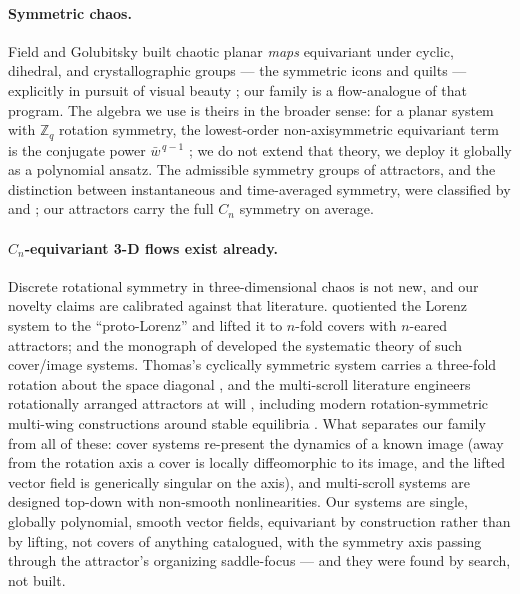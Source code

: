 \documentclass[11pt]{article}
\newcommand{\conj}[1]{\bar{#1}}
\begin{document}
\paragraph{Symmetric chaos.}
Field and Golubitsky built chaotic planar \emph{maps} equivariant under
cyclic, dihedral, and crystallographic groups --- the symmetric icons and
quilts --- explicitly in pursuit of visual beauty
\citep{fieldGolubitsky2009}; our family is a flow-analogue of that program.
The algebra we use is theirs in the broader sense: for a planar system with
$\mathbb{Z}_q$ rotation symmetry, the lowest-order non-axisymmetric
equivariant term is the conjugate power $\conj{w}^{\,q-1}$
\citep{golubitskyStewartSchaeffer1988}; we do not extend that theory, we
deploy it globally as a polynomial ansatz. The admissible symmetry groups
of attractors, and the distinction between instantaneous and time-averaged
symmetry, were classified by \citet{melbourneDellnitzGolubitsky1993} and
\citet{ashwinMelbourne1994}; our attractors carry the full $C_n$ symmetry
on average.

\paragraph{$C_n$-equivariant 3-D flows exist already.}
Discrete rotational symmetry in three-dimensional chaos is not new, and
our novelty claims are calibrated against that literature.
\citet{mirandaStone1993} quotiented the Lorenz system to the
``proto-Lorenz'' and lifted it to $n$-fold covers with $n$-eared
attractors; \citet{letellierGilmore2001} and the monograph of
\citet{gilmoreLetellier2007} developed the systematic theory of such
cover/image systems. Thomas's cyclically symmetric system carries a
three-fold rotation about the space diagonal \citep{thomas1999}, and the
multi-scroll literature engineers rotationally arranged attractors at will
\citep{luChen2006}, including modern rotation-symmetric multi-wing
constructions around stable equilibria \citep{yang2021multiwing}. What
separates our family from all of these: cover systems re-present the
dynamics of a known image (away from the rotation axis a cover is locally
diffeomorphic to its image, and the lifted vector field is generically
singular on the axis), and multi-scroll systems are designed top-down with
non-smooth nonlinearities. Our systems are single, globally polynomial,
smooth vector fields, equivariant by construction rather than by lifting,
not covers of anything catalogued, with the symmetry axis passing through
the attractor's organizing saddle-focus --- and they were found by search,
not built.
\end{document}
